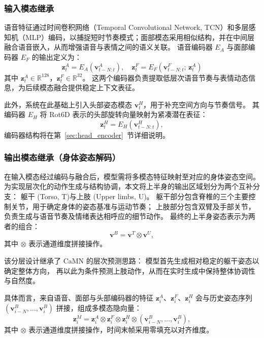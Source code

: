 \subsubsection{输入模态继承}

语音特征通过时间卷积网络（Temporal Convolutional Network, TCN）和多层感知机（MLP）编码，以捕捉短时节奏模式；面部模态采用相似结构，并在中间层融合语音嵌入，从而增强语音与表情之间的语义关联。  
语音编码器 $E_A$ 与面部编码器 $E_F$ 的输出定义为：
\begin{equation}
\bm{z}^{A}_t = E_A(\bm{v}_{t-N:t}^{A}), \quad
\bm{z}^{F}_t = E_F(\bm{v}_{t-N:t}^{F};\, \bm{z}^{A}_t)
\end{equation}
其中 $\bm{z}^{A}_t \in \mathbb{R}^{128}$，$\bm{z}^{F}_t  \in \mathbb{R}^{32}$。
这两个编码器负责提取低层次语音节奏与表情动态信息，为后续模态融合提供稳定上下文表征。

此外，系统在此基础上引入头部姿态模态 $\bm{v}_t^{H}$，用于补充空间方向与节奏信号。
其编码器 $E_H$ 将 Rot6D 表示的头部旋转向量映射为紧凑潜在表征：
\begin{equation}
\bm{z}^{H}_t = E_H(\bm{v}_{t-N:t}^{H}),
\end{equation}
编码器结构将在第~\ref{sec:head_encoder}~节详细说明。

\subsubsection{输出模态继承（身体姿态解码）}

在输入模态经过编码与融合后，模型需将多模态特征映射至对应的身体姿态空间。
为实现层次化的动作生成与结构协调，本文将上半身的输出区域划分为两个互补分支：
躯干 (Torso, T)与上肢 (Upper limbs, U)。
躯干部分包含脊椎的三个主要控制关节，用于确定身体的姿态基准与运动节奏；
上肢部分包含双臂及手部关节，负责生成与语音节奏及情绪表达相呼应的细节动作。
最终的上半身姿态表示为两者的组合：
\begin{equation}
\bm{v}^B = \bm{v}^T \otimes \bm{v}^U,
\end{equation}
其中 $\otimes$ 表示通道维度拼接操作。

该分层设计继承了 CaMN 的层次预测思路：
模型首先生成相对稳定的躯干姿态以确定整体方向，
再以此为条件预测上肢动作，从而在实时生成中保持整体协调性与自然度。

具体而言，来自语音、面部与头部编码器的特征
$\bm{z}_i^{A}$、$\bm{z}_i^{F}$、$\bm{z}_i^{H}$ 会与历史姿态序列 $(\bm{v}_{i-N}^{B}, \ldots, \bm{v}_i^{B})$ 拼接，组成多模态隐向量：
\begin{equation}
\bm{z}_i^{M} = \bm{z}_i^{A} \otimes \bm{z}_i^{F} \otimes \bm{z}_i^{H} \otimes (\bm{v}_{i-N}^{B}, \ldots, \bm{v}_i^{B}),
\end{equation}
其中 $\otimes$ 表示通道维度拼接操作，时间末帧采用零填充以对齐维度。

